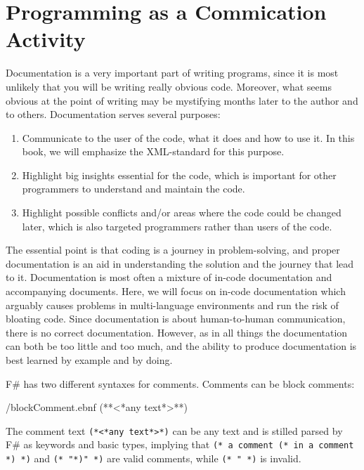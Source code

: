 \documentclass[fsharpNotes.tex]{subfiles}
\begin{document}
\section{Programming as a Commication Activity}
\label{chap:documentation}
Documentation is a very important part of writing programs, since it is most unlikely that you will be writing really obvious code. Moreover, what seems obvious at the point of writing may be mystifying months later to the author and to others. Documentation serves several purposes:
\begin{enumerate}
\item Communicate to the user of the code, what it does and how to use it. In this book, we will emphasize the XML-standard for this purpose.
\item Highlight big insights essential for the code, which is important for other programmers to understand and maintain the code.
\item Highlight possible conflicts and/or areas where the code could be changed later, which is also targeted programmers rather than users of the code.
\end{enumerate}
The essential point is that coding is a journey in problem-solving, and proper documentation is an aid in understanding the solution and the journey that lead to it. Documentation is most often a mixture of in-code documentation and accompanying documents. Here, we will focus on in-code documentation which arguably causes problems in multi-language environments and run the risk of bloating code. Since documentation is about human-to-human communication, there is no correct documentation. However, as in all things the documentation can both be too little and too much, and the ability to produce documentation is best learned by example and by doing.

F\# has two different syntaxes for comments. Comments can be block
comments: 
%
\begin{verbatimwrite}{\ebnf/blockComment.ebnf}
(**<*any text*>**)
\end{verbatimwrite}
%
The comment text \lstinline[language=syntax]{(*<*any text*>*)} can be any text and is stilled parsed by F\# as keywords and basic types, implying that \lstinline!(* a comment (* in a comment *) *)! and \lstinline[morecomment={[l][\color{commentsColor}]{(*}}]!(* "*)" *)! are valid comments, while \lstinline!(* " *)! is invalid.
\end{document}
